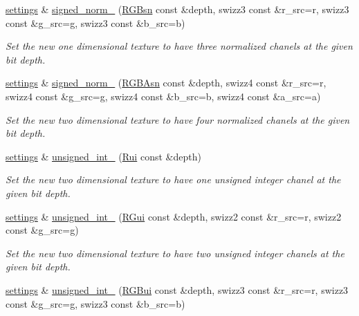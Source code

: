 \begin{DoxyCompactItemize}
\hyperlink{classgfx_1_1texture__2D_1_1settings}{settings} \& \hyperlink{classgfx_1_1texture__2D_1_1settings_a31e81657f9776daf3b9f613e9a4aad30}{signed\-\_\-norm\-\_} (\hyperlink{classgfx_1_1RGBsn}{R\-G\-Bsn} const \&depth, swizz3 const \&r\-\_\-src=r, swizz3 const \&g\-\_\-src=g, swizz3 const \&b\-\_\-src=b)
\begin{DoxyCompactList}\small\item\em Set the new one dimensional texture to have three normalized chanels at the given bit depth. \end{DoxyCompactList}\item 
\hyperlink{classgfx_1_1texture__2D_1_1settings}{settings} \& \hyperlink{classgfx_1_1texture__2D_1_1settings_a99e1ce007cb7fae17fa4b36172fe76f9}{signed\-\_\-norm\-\_} (\hyperlink{classgfx_1_1RGBAsn}{R\-G\-B\-Asn} const \&depth, swizz4 const \&r\-\_\-src=r, swizz4 const \&g\-\_\-src=g, swizz4 const \&b\-\_\-src=b, swizz4 const \&a\-\_\-src=a)
\begin{DoxyCompactList}\small\item\em Set the new two dimensional texture to have four normalized chanels at the given bit depth. \end{DoxyCompactList}\item 
\hyperlink{classgfx_1_1texture__2D_1_1settings}{settings} \& \hyperlink{classgfx_1_1texture__2D_1_1settings_ac37ad6bf233d83ea65892e77aba48ddd}{unsigned\-\_\-int\-\_} (\hyperlink{classgfx_1_1Rui}{Rui} const \&depth)
\begin{DoxyCompactList}\small\item\em Set the new two dimensional texture to have one unsigned integer chanel at the given bit depth. \end{DoxyCompactList}\item 
\hyperlink{classgfx_1_1texture__2D_1_1settings}{settings} \& \hyperlink{classgfx_1_1texture__2D_1_1settings_a95a8165907ca0002982637eec54ac4ff}{unsigned\-\_\-int\-\_} (\hyperlink{classgfx_1_1RGui}{R\-Gui} const \&depth, swizz2 const \&r\-\_\-src=r, swizz2 const \&g\-\_\-src=g)
\begin{DoxyCompactList}\small\item\em Set the new two dimensional texture to have two unsigned integer chanels at the given bit depth. \end{DoxyCompactList}\item 
\hyperlink{classgfx_1_1texture__2D_1_1settings}{settings} \& \hyperlink{classgfx_1_1texture__2D_1_1settings_a3a6ae0d1de3db6b8e24415f234c93a51}{unsigned\-\_\-int\-\_} (\hyperlink{classgfx_1_1RGBui}{R\-G\-Bui} const \&depth, swizz3 const \&r\-\_\-src=r, swizz3 const \&g\-\_\-src=g, swizz3 const \&b\-\_\-src=b)

\end{DoxyCompactItemize}
